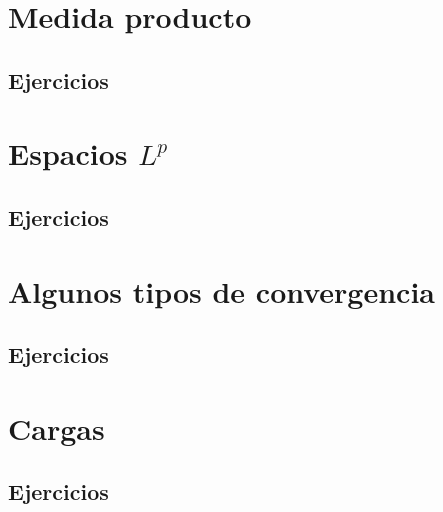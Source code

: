 \documentclass[spanish,12pt,a4paper,openany]{book}
\begin{document}
\chapter{Medida producto}
	\section{Ejercicios}
\chapter{Espacios $L^{p}$}
	\section{Ejercicios}
\chapter{Algunos tipos de convergencia}
	\section{Ejercicios}
\chapter{Cargas}
	\section{Ejercicios}
\end{document}
